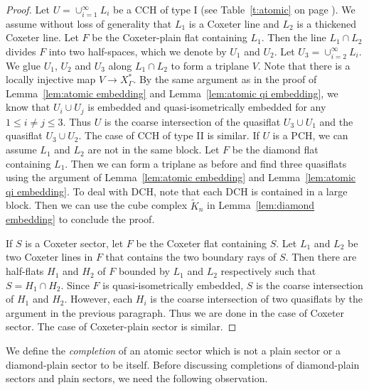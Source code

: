 \documentclass[11pt]{amsart}
\theoremstyle{definition}
\newcommand{\Xa}{X^{\ast}}
\begin{document}
\begin{proof}
Let $U=\cup_{i=1}^{\infty}L_i$ be a CCH of type I (see Table~\ref{t:atomic} on page \pageref{t:atomic}). We assume without loss of generality that $L_1$ is a Coxeter line and $L_2$ is a thickened Coxeter line. Let $F$ be the Coxeter-plain flat containing $L_1$. Then the line $L_1\cap L_2$ divides $F$ into two half-spaces, which we denote by $U_1$ and $U_2$. Let $U_3=\cup_{i=2}^{\infty}L_i$. We glue $U_1$, $U_2$ and $U_3$ along $L_1\cap L_2$ to form a triplane $V$. Note that there is a locally injective map $V\to\Xa_\Gamma$. By the same argument as in the proof of Lemma~\ref{lem:atomic embedding} and Lemma~\ref{lem:atomic qi embedding}, we know that $U_i\cup U_j$ is embedded and quasi-isometrically embedded for any $1\le i\neq j\le 3$. Thus $U$ is the coarse intersection of the quasiflat $U_3\cup U_1$ and the quasiflat $U_3\cup U_2$. The case of CCH of type II is similar. If $U$ is a PCH, we can assume $L_1$ and $L_2$ are not in the same block. Let $F$ be the diamond flat containing $L_1$. Then we can form a triplane as before and find three quasiflats using the argument of Lemma~\ref{lem:atomic embedding} and Lemma~\ref{lem:atomic qi embedding}. To deal with DCH, note that each DCH is contained in a large block. Then we can use the cube complex $\tilde K_n$ in Lemma~\ref{lem:diamond embedding} to conclude the proof.

If $S$ is a Coxeter sector, let $F$ be the Coxeter flat containing $S$. Let $L_1$ and $L_2$ be two Coxeter lines in $F$ that contains the two boundary rays of $S$. Then there are half-flats $H_1$ and $H_2$ of $F$ bounded by $L_1$ and $L_2$ respectively such that $S=H_1\cap H_2$. Since $F$ is quasi-isometrically embedded, $S$ is the coarse intersection of $H_1$ and $H_2$. However, each $H_i$ is the coarse intersection of two quasiflats by the argument in the previous paragraph. Thus we are done in the case of Coxeter sector. The case of Coxeter-plain sector is similar.
\end{proof}

We define the \emph{completion} of an atomic sector which is not a plain sector or a diamond-plain sector to be itself. Before discussing completions of diamond-plain sectors and plain sectors, we need the following observation.
\end{document}
